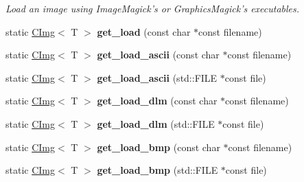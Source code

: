 \begin{DoxyCompactItemize}
\begin{DoxyCompactList}\small\item\em Load an image using ImageMagick's or GraphicsMagick's executables. \item\end{DoxyCompactList}\item 
\hypertarget{structcimg__library_1_1CImg_a149e94256155d10130a088f8219edd04}{
static \hyperlink{structcimg__library_1_1CImg}{CImg}$<$ T $>$ {\bfseries get\_\-load} (const char $\ast$const filename)}
\label{structcimg__library_1_1CImg_a149e94256155d10130a088f8219edd04}

\item 
\hypertarget{structcimg__library_1_1CImg_afcae43f9eea505f08646f97851f59c64}{
static \hyperlink{structcimg__library_1_1CImg}{CImg}$<$ T $>$ {\bfseries get\_\-load\_\-ascii} (const char $\ast$const filename)}
\label{structcimg__library_1_1CImg_afcae43f9eea505f08646f97851f59c64}

\item 
\hypertarget{structcimg__library_1_1CImg_a1190e52307e0b889e6e7c25b7a952e4f}{
static \hyperlink{structcimg__library_1_1CImg}{CImg}$<$ T $>$ {\bfseries get\_\-load\_\-ascii} (std::FILE $\ast$const file)}
\label{structcimg__library_1_1CImg_a1190e52307e0b889e6e7c25b7a952e4f}

\item 
\hypertarget{structcimg__library_1_1CImg_a834668164d25f97f373b1fd6059d2a4b}{
static \hyperlink{structcimg__library_1_1CImg}{CImg}$<$ T $>$ {\bfseries get\_\-load\_\-dlm} (const char $\ast$const filename)}
\label{structcimg__library_1_1CImg_a834668164d25f97f373b1fd6059d2a4b}

\item 
\hypertarget{structcimg__library_1_1CImg_a5e6bcc6437704aa72ca141fb64c0c152}{
static \hyperlink{structcimg__library_1_1CImg}{CImg}$<$ T $>$ {\bfseries get\_\-load\_\-dlm} (std::FILE $\ast$const file)}
\label{structcimg__library_1_1CImg_a5e6bcc6437704aa72ca141fb64c0c152}

\item 
\hypertarget{structcimg__library_1_1CImg_a4f7b2075e2aaa64ebbf67e87291606f4}{
static \hyperlink{structcimg__library_1_1CImg}{CImg}$<$ T $>$ {\bfseries get\_\-load\_\-bmp} (const char $\ast$const filename)}
\label{structcimg__library_1_1CImg_a4f7b2075e2aaa64ebbf67e87291606f4}

\item 
\hypertarget{structcimg__library_1_1CImg_a22e84ea951e6e1def7e4569de0243710}{
static \hyperlink{structcimg__library_1_1CImg}{CImg}$<$ T $>$ {\bfseries get\_\-load\_\-bmp} (std::FILE $\ast$const file)}
\label{structcimg__library_1_1CImg_a22e84ea951e6e1def7e4569de0243710}


\end{DoxyCompactItemize}
